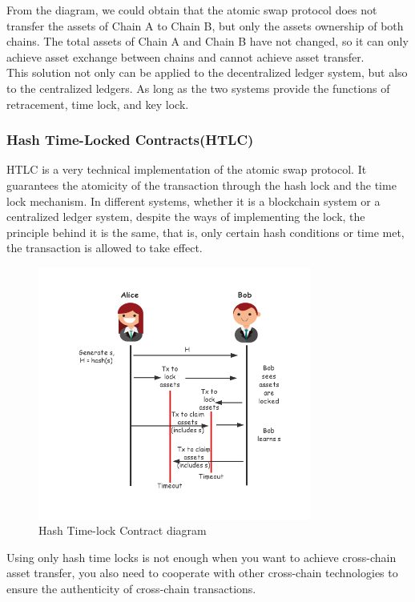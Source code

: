 \noindent From the diagram, we could obtain that the atomic swap protocol does not transfer the assets of Chain A to Chain B, but only the assets ownership of both chains. The total assets of Chain A and Chain B have not changed, so it can only achieve asset exchange between chains and cannot achieve asset transfer.\\
\noindent This solution not only can be applied to the decentralized ledger system, but also to the centralized ledgers. As long as the two systems provide the functions of retracement, time lock, and key lock.

\subsubsection{Hash Time-Locked Contracts(HTLC)}
\noindent HTLC is a very technical implementation of the atomic swap protocol. It guarantees the atomicity of the transaction through the hash lock and the time lock mechanism. In different systems, whether it is a blockchain system or a centralized ledger system, despite the ways of implementing the lock, the principle behind it is the same, that is, only certain hash conditions or time met, the transaction is allowed to take effect.

        \begin{figure}[H]
        \includegraphics[width=0.8\textwidth]{./figures/Hashlock.png}
        \centering
        \caption{Hash Time-lock Contract diagram}%
        \centering
        \label{fig:hash}
        \end{figure}
\noindent Using only hash time locks is not enough when you want to achieve cross-chain asset transfer, you also need to cooperate with other cross-chain technologies to ensure the authenticity of cross-chain transactions.
